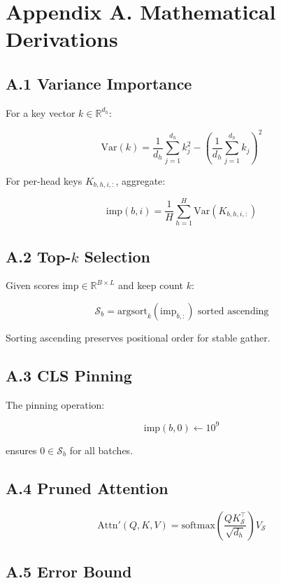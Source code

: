 
\section{Appendix A. Mathematical Derivations}

\subsection{A.1 Variance Importance}

For a key vector $k \in \mathbb{R}^{d_h}$:

\[
\text{Var}(k) = \frac{1}{d_h} \sum_{j=1}^{d_h} k_j^2 - \left(\frac{1}{d_h} \sum_{j=1}^{d_h} k_j\right)^2
\tag{A.1}
\]

For per-head keys $K_{b,h,i,:}$, aggregate:

\[
\text{imp}(b, i) = \frac{1}{H} \sum_{h=1}^{H} \text{Var}(K_{b,h,i,:})
\tag{A.2}
\]

\subsection{A.2 Top-$k$ Selection}

Given scores $\text{imp} \in \mathbb{R}^{B \times L}$ and keep count $k$:

\[
\mathcal{S}_b = \text{argsort}_{k}(\text{imp}_{b,:}) \text{ sorted ascending}
\tag{A.3}
\]

Sorting ascending preserves positional order for stable gather.

\subsection{A.3 CLS Pinning}

The pinning operation:

\[
\text{imp}(b, 0) \leftarrow 10^9
\tag{A.4}
\]

ensures $0 \in \mathcal{S}_b$ for all batches.

\subsection{A.4 Pruned Attention}

\[
\text{Attn}'(Q, K, V) = \text{softmax}\!\left(\frac{Q K_{\mathcal{S}}^\top}{\sqrt{d_h}}\right)V_{\mathcal{S}}
\tag{A.5}
\]

\subsection{A.5 Error Bound}

